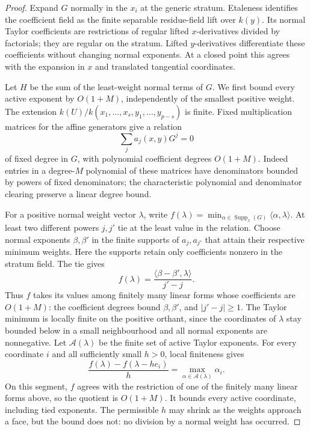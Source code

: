 \begin{proof}
Expand \(G\) normally in the \(x_i\) at the generic stratum.
Etaleness identifies the coefficient field as the finite separable
residue-field lift over \(k(y)\). Its normal Taylor coefficients are
restrictions of regular lifted \(x\)-derivatives divided by factorials;
they are regular on the stratum. Lifted \(y\)-derivatives differentiate
these coefficients without changing normal exponents. At a closed
point this agrees with the expansion in \(x\) and translated tangential
coordinates.

Let \(H\) be the sum of the least-weight normal terms of \(G\).
We first bound every active exponent by \(O(1+M)\), independently of
the smallest positive weight. The extension
\(k(U)/k(x_1,\ldots,x_s,y_1,\ldots,y_{p-s})\) is finite.
Fixed multiplication matrices for the affine generators give a relation
\[
                         \sum_j a_j(x,y)G^j=0
\]
of fixed degree in \(G\), with polynomial coefficient degrees
\(O(1+M)\). Indeed entries in a degree-\(M\) polynomial of these
matrices have denominators bounded by powers of fixed denominators;
the characteristic polynomial and denominator clearing preserve a
linear degree bound.

For a positive normal weight vector \(\lambda\), write
\(f(\lambda)=\min_{\alpha\in\operatorname{Supp}_x(G)}
\langle\alpha,\lambda\rangle\).
At least two different powers \(j,j'\) tie at the least value in the
relation. Choose normal exponents \(\beta,\beta'\) in the finite
supports of \(a_j,a_{j'}\) that attain their respective minimum weights.
Here the supports retain only coefficients nonzero in the stratum field.
The tie gives
\[
 f(\lambda)=
 \frac{\langle\beta-\beta',\lambda\rangle}{j'-j}.
\]
Thus \(f\) takes its values among finitely many linear forms whose
coefficients are \(O(1+M)\): the coefficient degrees bound
\(\beta,\beta'\), and \(|j'-j|\geq1\).
The Taylor minimum is locally finite on the positive orthant, since
the coordinates of \(\lambda\) stay bounded below in a small
neighbourhood and all normal exponents are nonnegative.
Let \(\mathcal A(\lambda)\) be the finite set of active Taylor
exponents. For every coordinate \(i\) and all sufficiently small
\(h>0\), local finiteness gives
\[
 \frac{f(\lambda)-f(\lambda-he_i)}{h}
       =\max_{\alpha\in\mathcal A(\lambda)}\alpha_i.
\]
On this segment, \(f\) agrees with the restriction of one of the
finitely many linear forms above, so the quotient is \(O(1+M)\).
It bounds every active coordinate, including tied exponents.
The permissible \(h\) may shrink as the weights approach a face,
but the bound does not: no division by a normal weight has occurred.


\end{proof}
